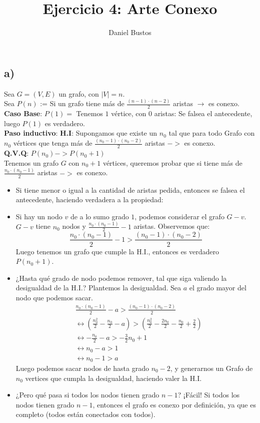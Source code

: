 \documentclass{article}
\author{Daniel Bustos}
\title{Ejercicio 4: Arte Conexo}
\begin{document}
\subsection{a)}
Sea $G = (V,E)$ un grafo, con $|V| = n$. \\
Sea $P(n)$ := Si un grafo tiene más de $\frac{(n-1) \cdot (n-2)}{2}$ aristas $\rightarrow$ es conexo. \\

\textbf{Caso Base}: $P(1) =$ Tenemos $1$ vértice, con $0$ aristas: Se falsea el antecedente, luego $P(1)$ es verdadero. \\

\textbf{Paso inductivo}: \textbf{H.I}: Supongamos que existe un $n_0$ tal que para todo Grafo con $n_0$ vértices que tenga más de $\frac{(n_0 - 1) \cdot (n_0 - 2)}{2}$ aristas $->$ es conexo. \\

\textbf{Q.V.Q}: $P(n_0) -> P(n_0  + 1)$ \\

Tenemos un grafo $G$ con $n_0 + 1$ vértices, queremos probar que si tiene más de $\frac{n_0 \cdot (n_0-1)}{2}$ aristas $->$ es conexo.
\begin{itemize}

	\item Si tiene menor o igual a la cantidad de aristas pedida, entonces se falsea el antecedente, haciendo verdadera a la propiedad:

    \item Si hay un nodo $v$ de a lo sumo grado $1$, podemos considerar el grafo $G-v$. $G-v$ tiene $n_0$ nodos y $\frac{n_0 \cdot (n_0 -1)}{2}  - 1$ aristas. Observemos que: 
    $$\frac{n_0 \cdot (n_0 -1)}{2}  - 1 > \frac{(n_0-1) \cdot (n_0-2)}{2}$$ 
    Luego tenemos un grafo que cumple la H.I., entonces es verdadero $P(n_0 + 1)$.
    
    \item ¿Hasta qué grado de nodo podemos remover, tal que siga valiendo la desigualdad de la H.I.? Plantemos la desigualdad. Sea $a$ el grado mayor del nodo que podemos sacar.
    \begin{align*}
        &\frac{n_0 \cdot (n_0 -1)}{2}  - a > \frac{(n_0-1) \cdot (n_0-2)}{2} \\
        &\leftrightarrow \left(\frac{n_0^2}{2} -\frac{n_0}{2} - a\right) > \left(\frac{n_0^2}{2} - \frac{2n_0}{2} - \frac{n_0}{2} + \frac{2}{2}\right) \\
        &\leftrightarrow -\frac{n_0}{2}  -a > - \frac{3}{2}n_0 + 1 \\
        &\leftrightarrow n_0 - a > 1 \\
        &\leftrightarrow n_0 - 1 > a
    \end{align*}
   Luego podemos sacar nodos de hasta grado $n_0 - 2$, y generarnos un Grafo de $n_0$ vertices que  cumpla la desigualdad,  haciendo valer la H.I. \item ¿Pero qué pasa si todos los nodos tienen grado $n-1$? 
   ¡Fácil! Si todos los nodos tienen grado $n -1$, entonces el grafo es conexo por definición, ya que es completo (todos están conectados con todos).
\end{itemize}    
\end{document}

